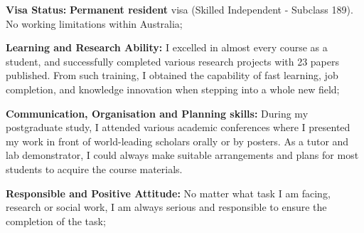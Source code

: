
\begin{cventries}
    \cventry[top=3mm,bottom=3mm]{}{}{}{}
    {
        \begin{cvitems}
            \item \textbf{Visa Status:} \textbf{Permanent resident} visa (Skilled Independent - Subclass 189). No working limitations within Australia;
            \item \textbf{Learning and Research Ability:} I excelled in almost every course as a student, and successfully completed various research projects with 23 papers published. From such training, I obtained the capability of fast learning, job completion, and knowledge innovation when stepping into a whole new field;
            \item \textbf{Communication, Organisation and Planning skills:}  During my postgraduate study, I attended various academic conferences where I presented my work in front of world-leading scholars orally or by posters. As a tutor and lab demonstrator, I could always make suitable arrangements and plans for most students to acquire the course materials.
            \item \textbf{Responsible and Positive Attitude:} No matter what task I am facing, research or social work, I am always serious and responsible to ensure the completion of the task;
        \end{cvitems}
    }
\end{cventries}